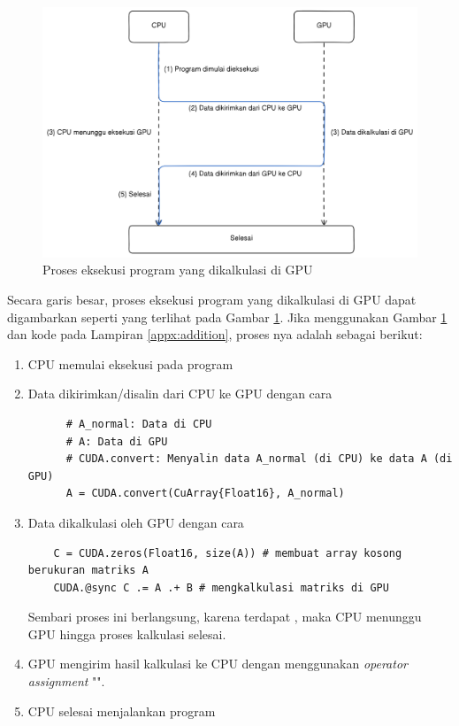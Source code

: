 \begin{figure}[H]
	\centering
	\includegraphics[width=14cm, scale=1]{images/process-cpu-gpu-calculation.png}
	\caption{Proses eksekusi program yang dikalkulasi di GPU}
	\label{img:process-cpu-gpu-calculation}
\end{figure}

Secara garis besar, proses eksekusi program yang dikalkulasi di GPU dapat digambarkan seperti yang terlihat pada Gambar \ref{img:process-cpu-gpu-calculation}. Jika menggunakan Gambar \ref{img:process-cpu-gpu-calculation} dan kode pada Lampiran \ref{appx:addition}, proses nya adalah sebagai berikut:

\begin{enumerate}
	\item CPU memulai eksekusi pada program
	\item Data dikirimkan/disalin dari CPU ke GPU dengan cara
	      \begin{lstlisting}
      # A_normal: Data di CPU
      # A: Data di GPU
      # CUDA.convert: Menyalin data A_normal (di CPU) ke data A (di GPU)
      A = CUDA.convert(CuArray{Float16}, A_normal)
      \end{lstlisting}
	\item Data dikalkulasi oleh GPU dengan cara
	      \begin{lstlisting}
	C = CUDA.zeros(Float16, size(A)) # membuat array kosong berukuran matriks A
	CUDA.@sync C .= A .+ B # mengkalkulasi matriks di GPU
      \end{lstlisting}
	      Sembari proses ini berlangsung, karena terdapat , maka CPU menunggu GPU hingga proses kalkulasi selesai.
	\item GPU mengirim hasil kalkulasi ke CPU dengan menggunakan \emph{operator assignment} "\cw{=}".
	\item CPU selesai menjalankan program
\end{enumerate}

